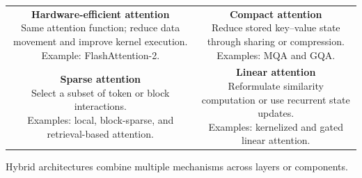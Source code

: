 \begin{center}
\setlength{\fboxsep}{5pt}
\renewcommand{\arraystretch}{1.2}
\begin{tabular}{cc}
    \fbox{\parbox[t][1.8cm][t]{0.43\textwidth}{\centering
        \textbf{Hardware-efficient attention}\\[0.2em]
        \scriptsize Same attention function; reduce data movement and
        improve kernel execution.\\
        Example: FlashAttention-2.}} &
    \fbox{\parbox[t][1.8cm][t]{0.43\textwidth}{\centering
        \textbf{Compact attention}\\[0.2em]
        \scriptsize Reduce stored key--value state through sharing or
        compression.\\
        Examples: MQA and GQA.}}\\[0.35em]
    \fbox{\parbox[t][1.8cm][t]{0.43\textwidth}{\centering
        \textbf{Sparse attention}\\[0.2em]
        \scriptsize Select a subset of token or block interactions.\\
        Examples: local, block-sparse, and retrieval-based attention.}} &
    \fbox{\parbox[t][1.8cm][t]{0.43\textwidth}{\centering
        \textbf{Linear attention}\\[0.2em]
        \scriptsize Reformulate similarity computation or use recurrent
        state updates.\\
        Examples: kernelized and gated linear attention.}}
\end{tabular}

\par\smallskip
\footnotesize
Hybrid architectures combine multiple mechanisms across layers or components.
\normalsize
\end{center}
